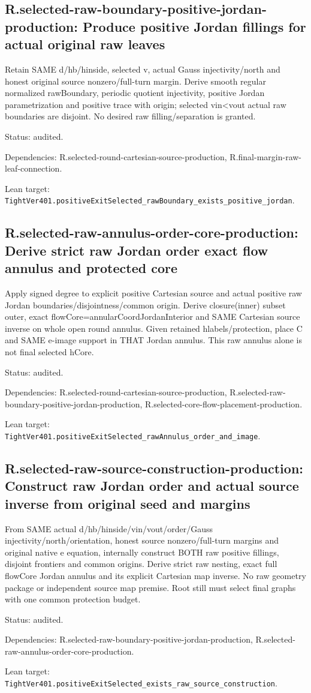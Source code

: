 \documentclass{article}
\begin{document}
\subsection*{R.selected-raw-boundary-positive-jordan-production: Produce positive Jordan fillings for actual original raw leaves}
Retain SAME d/hb/hinside, selected v, actual Gauss injectivity/north and honest original source nonzero/full-turn margin. Derive smooth regular normalized rawBoundary, periodic quotient injectivity, positive Jordan parametrization and positive trace with origin; selected vin<vout actual raw boundaries are disjoint. No desired raw filling/separation is granted.
\par Status: audited.
\par Dependencies: R.selected-round-cartesian-source-production, R.final-margin-raw-leaf-connection.
\par Lean target: \texttt{TightVer401.positiveExitSelected\_rawBoundary\_exists\_positive\_jordan}.
\subsection*{R.selected-raw-annulus-order-core-production: Derive strict raw Jordan order exact flow annulus and protected core}
Apply signed degree to explicit positive Cartesian source and actual positive raw Jordan boundaries/disjointness/common origin. Derive closure(inner) subset outer, exact flowCore=annularCoordJordanInterior and SAME Cartesian source inverse on whole open round annulus. Given retained hlabels/protection, place C and SAME e-image support in THAT Jordan annulus. This raw annulus alone is not final selected hCore.
\par Status: audited.
\par Dependencies: R.selected-round-cartesian-source-production, R.selected-raw-boundary-positive-jordan-production, R.selected-core-flow-placement-production.
\par Lean target: \texttt{TightVer401.positiveExitSelected\_rawAnnulus\_order\_and\_image}.
\subsection*{R.selected-raw-source-construction-production: Construct raw Jordan order and actual source inverse from original seed and margins}
From SAME actual d/hb/hinside/vin/vout/order/Gauss injectivity/north/orientation, honest source nonzero/full-turn margins and original native e equation, internally construct BOTH raw positive fillings, disjoint frontiers and common origins. Derive strict raw nesting, exact full flowCore Jordan annulus and its explicit Cartesian map inverse. No raw geometry package or independent source map premise. Root still must select final graphs with one common protection budget.
\par Status: audited.
\par Dependencies: R.selected-raw-boundary-positive-jordan-production, R.selected-raw-annulus-order-core-production.
\par Lean target: \texttt{TightVer401.positiveExitSelected\_exists\_raw\_source\_construction}.
\end{document}
